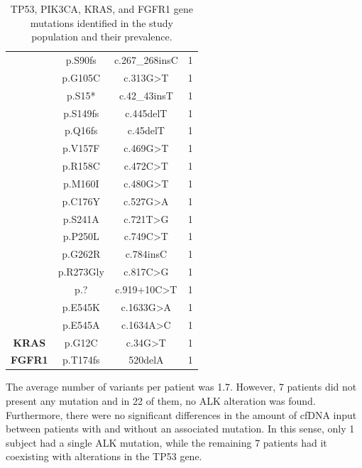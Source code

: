 \begin{table}[t]
{\begin{tabular}{cccc}
\rowcolor[HTML]{EFEFEF} 
\cellcolor[HTML]{FFFFFF} & p.S90fs & c.267\_268insC & 1 \\
\rowcolor[HTML]{FFFFFF} 
\cellcolor[HTML]{FFFFFF} & p.G105C & c.313G\textgreater{}T & 1 \\
\rowcolor[HTML]{EFEFEF} 
\cellcolor[HTML]{FFFFFF} & p.S15* & c.42\_43insT & 1 \\
\rowcolor[HTML]{FFFFFF} 
\cellcolor[HTML]{FFFFFF} & p.S149fs & c.445delT & 1 \\
\rowcolor[HTML]{EFEFEF} 
\cellcolor[HTML]{FFFFFF} & p.Q16fs & c.45delT & 1 \\
\rowcolor[HTML]{FFFFFF} 
\cellcolor[HTML]{FFFFFF} & p.V157F & c.469G\textgreater{}T & 1 \\
\rowcolor[HTML]{EFEFEF} 
\cellcolor[HTML]{FFFFFF} & p.R158C & c.472C\textgreater{}T & 1 \\
\rowcolor[HTML]{FFFFFF} 
\cellcolor[HTML]{FFFFFF} & p.M160I & c.480G\textgreater{}T & 1 \\
\rowcolor[HTML]{EFEFEF} 
\cellcolor[HTML]{FFFFFF} & p.C176Y & c.527G\textgreater{}A & 1 \\
\rowcolor[HTML]{FFFFFF} 
\cellcolor[HTML]{FFFFFF} & p.S241A & c.721T\textgreater{}G & 1 \\
\rowcolor[HTML]{EFEFEF} 
\cellcolor[HTML]{FFFFFF} & p.P250L & c.749C\textgreater{}T & 1 \\
\rowcolor[HTML]{FFFFFF} 
\cellcolor[HTML]{FFFFFF} & p.G262R & c.784insC & 1 \\
\rowcolor[HTML]{EFEFEF} 
\cellcolor[HTML]{FFFFFF} & p.R273Gly & c.817C\textgreater{}G & 1 \\
\rowcolor[HTML]{FFFFFF} 
\multirow{-23}{*}{\cellcolor[HTML]{FFFFFF}\textbf{TP53}}  & p.? & c.919+10C\textgreater{}T & 1 \\
\rowcolor[HTML]{EFEFEF} 
\cellcolor[HTML]{EFEFEF} & p.E545K & c.1633G\textgreater{}A & 1 \\
\rowcolor[HTML]{EFEFEF} 
\multirow{-2}{*}{\cellcolor[HTML]{EFEFEF}\textbf{PIK3CA}} & p.E545A & c.1634A\textgreater{}C & 1 \\
\rowcolor[HTML]{FFFFFF} 
\textbf{KRAS} & p.G12C & c.34G\textgreater{}T & 1 \\
\rowcolor[HTML]{EFEFEF}
\textbf{FGFR1} & p.T174fs & 520delA & 1
\end{tabular}}
\caption{TP53, PIK3CA, KRAS, and FGFR1 gene mutations identified in the study population and their prevalence.}
\label{tab:TP53_Mutations}
\end{table}

The average number of variants per patient was 1.7. However, 7 patients did not present any mutation and in 22 of them, no ALK alteration was found. Furthermore, there were no significant differences in the amount of cfDNA input between patients with and without an associated mutation. In this sense, only 1 subject had a single ALK mutation, while the remaining 7 patients had it coexisting with alterations in the TP53 gene.

